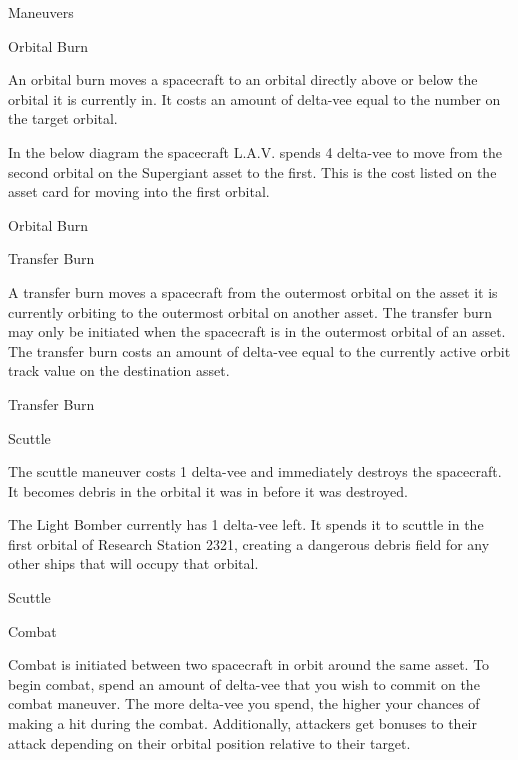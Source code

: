 \documentclass[twoside]{minimal}
\newenvironment{section}[1]
{\renewcommand{\title}{\begin{center} \fontsize{24.88}{32}\selectfont #1 \end{center}} \ignorespaces}
{\clearpage \ignorespacesafterend}
\newenvironment{supersection}[1]
{
\renewcommand{\title}{\begin{center} \fontsize{24.88}{32}\selectfont #1 \end{center}}
\renewenvironment{section}[1]
 {\title \renewcommand{\title}{\begin{flushleft} \fontsize{20.74}{28}\selectfont ##1 \end{flushleft}} \ignorespaces}
 {\clearpage \ignorespacesafterend}
\ignorespaces
}
{\clearpage \ignorespacesafterend}
\begin{document}
\begin{supersection}{Maneuvers}
    \begin{section}{Orbital Burn}
        \title

        An orbital burn moves a spacecraft to an orbital directly above or below the orbital it is currently in.
        It costs an amount of delta-vee equal to the number on the target orbital.

        In the below diagram the spacecraft L.A.V. spends 4 delta-vee to move from the second orbital on the Supergiant asset to the first.
        This is the cost listed on the asset card for moving into the first orbital.
    \end{section}

    \begin{section}{Transfer Burn}
        \title

        A transfer burn moves a spacecraft from the outermost orbital on the asset it is currently orbiting to the outermost orbital on another asset.
        The transfer burn may only be initiated when the spacecraft is in the outermost orbital of an asset.
        The transfer burn costs an amount of delta-vee equal to the currently active orbit track value on the destination asset.
    \end{section}

    \begin{section}{Scuttle}
        \title

        The scuttle maneuver costs 1 delta-vee and immediately destroys the spacecraft.
        It becomes debris in the orbital it was in before it was destroyed.

        The Light Bomber currently has 1 delta-vee left.
        It spends it to scuttle in the first orbital of Research Station 2321, creating a dangerous debris field for any other ships that will occupy that orbital.
    \end{section}

    \begin{section}{Combat}
        \title

        Combat is initiated between two spacecraft in orbit around the same asset.
        To begin combat, spend an amount of delta-vee that you wish to commit on the combat maneuver.
        The more delta-vee you spend, the higher your chances of making a hit during the combat.
        Additionally, attackers get bonuses to their attack depending on their orbital position relative to their target.


\end{section}
\end{supersection}
\end{document}
